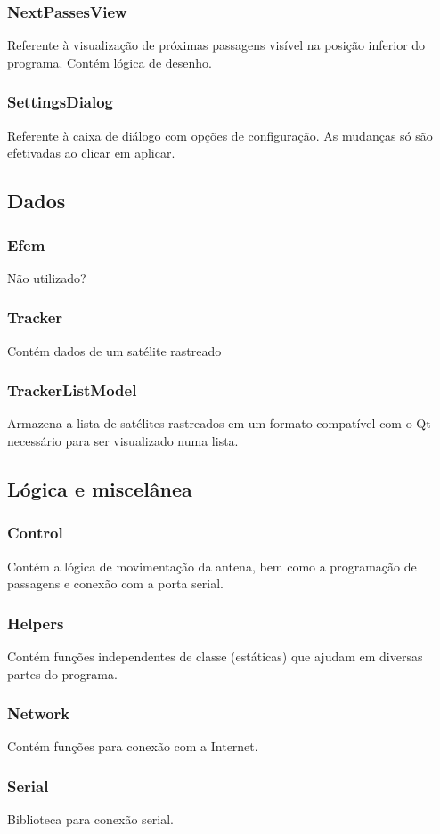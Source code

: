 \documentclass[12pt, a4paper]{article}
\begin{document}
\subsubsection{NextPassesView}
Referente à visualização de próximas passagens visível na posição inferior do
programa. Contém lógica de desenho.

\subsubsection{SettingsDialog}
Referente à caixa de diálogo com opções de configuração. As mudanças só são efetivadas ao clicar em aplicar.

\subsection{Dados}
\subsubsection{Efem}
Não utilizado?

\subsubsection{Tracker}
Contém dados de um satélite rastreado

\subsubsection{TrackerListModel}
Armazena a lista de satélites rastreados em um formato compatível com o Qt
necessário para ser visualizado numa lista.

\subsection{Lógica e miscelânea}
\subsubsection{Control}
Contém a lógica de movimentação da antena, bem como a programação de passagens
e conexão com a porta serial.

\subsubsection{Helpers}
Contém funções independentes de classe (estáticas) que ajudam em diversas
partes do programa.

\subsubsection{Network}
Contém funções para conexão com a Internet.

\subsubsection{Serial}
Biblioteca para conexão serial.
\end{document}
